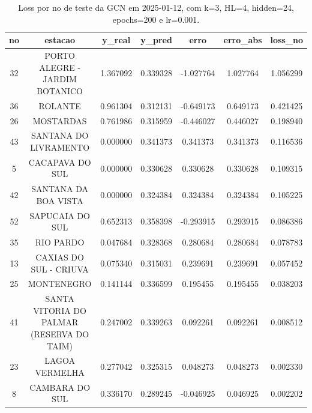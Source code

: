 \begin{table}[h]
\centering
\caption{Loss por no de teste da GCN em 2025-01-12, com k=3, HL=4, hidden=24, epochs=200 e lr=0.001.}
\label{tab:gcn_loss_k3_hl4_h24_e200_d20250112}
\begin{tabular}{ccccccc}
\toprule
no & estacao & y\_real & y\_pred & erro & erro\_abs & loss\_no \\
\midrule
32 & PORTO ALEGRE - JARDIM BOTANICO & 1.367092 & 0.339328 & -1.027764 & 1.027764 & 1.056299 \\
36 & ROLANTE & 0.961304 & 0.312131 & -0.649173 & 0.649173 & 0.421425 \\
26 & MOSTARDAS & 0.761986 & 0.315959 & -0.446027 & 0.446027 & 0.198940 \\
43 & SANTANA DO LIVRAMENTO & 0.000000 & 0.341373 & 0.341373 & 0.341373 & 0.116536 \\
5 & CACAPAVA DO SUL & 0.000000 & 0.330628 & 0.330628 & 0.330628 & 0.109315 \\
42 & SANTANA DA BOA VISTA & 0.000000 & 0.324384 & 0.324384 & 0.324384 & 0.105225 \\
52 & SAPUCAIA DO SUL & 0.652313 & 0.358398 & -0.293915 & 0.293915 & 0.086386 \\
35 & RIO PARDO & 0.047684 & 0.328368 & 0.280684 & 0.280684 & 0.078783 \\
13 & CAXIAS DO SUL - CRIUVA & 0.075340 & 0.315031 & 0.239691 & 0.239691 & 0.057452 \\
25 & MONTENEGRO & 0.141144 & 0.336599 & 0.195455 & 0.195455 & 0.038203 \\
41 & SANTA VITORIA DO PALMAR (RESERVA DO TAIM) & 0.247002 & 0.339263 & 0.092261 & 0.092261 & 0.008512 \\
23 & LAGOA VERMELHA & 0.277042 & 0.325315 & 0.048273 & 0.048273 & 0.002330 \\
8 & CAMBARA DO SUL & 0.336170 & 0.289245 & -0.046925 & 0.046925 & 0.002202 \\
\bottomrule
\end{tabular}
\end{table}
